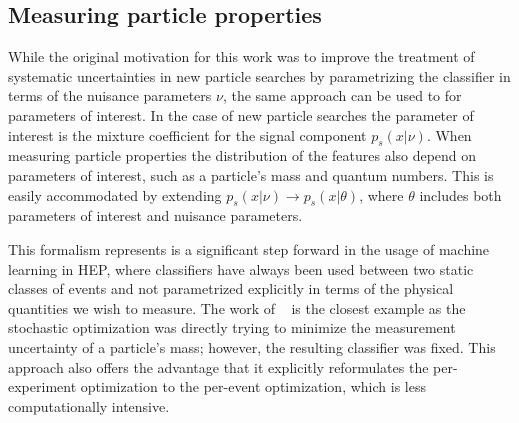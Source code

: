 \documentclass{article} %
\begin{document}
%

\subsection{Measuring particle properties}

While the original motivation for this work was to improve the treatment of systematic uncertainties in new particle searches by parametrizing the classifier in terms of the nuisance parameters $\nu$, the same approach can be used to for parameters of interest. In the case of new particle searches the parameter of interest is the mixture coefficient for the signal component $p_s(x|\nu)$. When measuring particle properties the distribution of the features also depend on parameters of interest, such as a particle's mass and quantum numbers. This is easily accommodated by extending $p_s(x|\nu) \to p_s(x|\theta)$, where $\theta$ includes both parameters of interest and nuisance parameters. 

This formalism represents is a significant step forward in the usage of machine learning in HEP, where classifiers have always been used between two static classes of events and not parametrized explicitly in terms of the physical quantities we wish to measure. The work of  ~\cite{Whiteson:2006ws} is the closest example as the stochastic optimization was directly trying to minimize the measurement uncertainty of a particle's mass; however, the resulting classifier was fixed. This approach also offers the advantage that it explicitly reformulates the per-experiment optimization to the per-event optimization, which is less computationally intensive.
\end{document}
